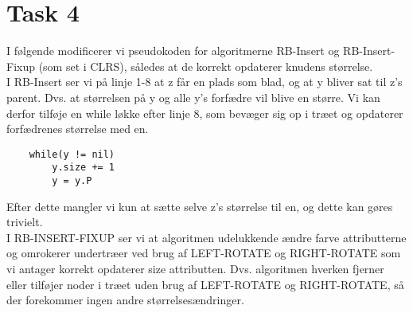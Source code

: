 \section{Task 4}

I følgende modificerer vi pseudokoden for algoritmerne RB-Insert og RB-Insert-Fixup (som set i CLRS), således at de korrekt opdaterer knudens størrelse.\\

I RB-Insert ser vi på linje 1-8 at z får en plads som blad, og at y bliver sat til z's parent. Dvs. at størrelsen på y og alle y's forfædre vil blive en større. Vi kan derfor tilføje en while løkke efter linje 8, som bevæger sig op i træet og opdaterer forfædrenes størrelse med en.
\begin{lstlisting}
	while(y != nil)
		y.size += 1
		y = y.P
\end{lstlisting}
Efter dette mangler vi kun at sætte selve z's størrelse til en, og dette kan gøres trivielt.\\

I RB-INSERT-FIXUP ser vi at algoritmen udelukkende ændre farve attributterne og omrokerer undertræer ved brug af LEFT-ROTATE og RIGHT-ROTATE som vi antager korrekt opdaterer size attributten. Dvs. algoritmen hverken fjerner eller tilføjer noder i træet uden brug af LEFT-ROTATE og RIGHT-ROTATE, så der forekommer ingen andre størrelsesændringer.
